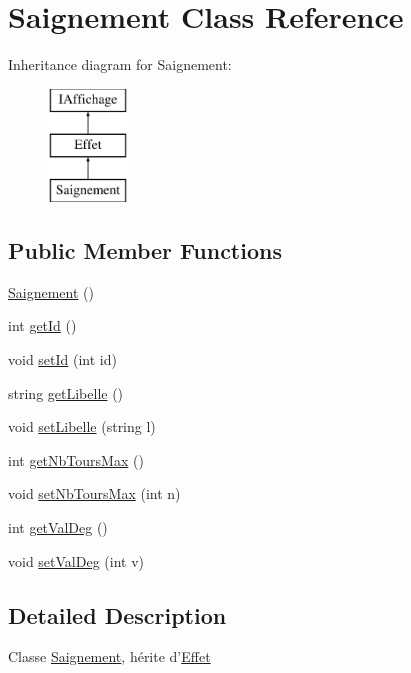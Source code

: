\hypertarget{class_saignement}{\section{\-Saignement \-Class \-Reference}
\label{class_saignement}
}
\-Inheritance diagram for \-Saignement\-:\begin{figure}[H]
\begin{center}
\leavevmode
\includegraphics[height=3.000000cm]{class_saignement}
\end{center}
\end{figure}
\subsection*{\-Public \-Member \-Functions}
\begin{DoxyCompactItemize}
\item 
\hyperlink{class_saignement_a83d7b835d237439cf350507765dbf8cf}{\-Saignement} ()
\item 
int \hyperlink{class_saignement_a57ccf17cade8c253a7ee99e7f816eb10}{get\-Id} ()
\item 
void \hyperlink{class_saignement_af9d66877c7e2aff769b4bc48f4bb82e4}{set\-Id} (int id)
\item 
string \hyperlink{class_saignement_aca2c045c2faa9384b6cf25ec3c11af28}{get\-Libelle} ()
\item 
void \hyperlink{class_saignement_a2c9f7ffb81aa8848564389580c4f7112}{set\-Libelle} (string l)
\item 
int \hyperlink{class_saignement_a498bf00562314e4094be4004e5bc653a}{get\-Nb\-Tours\-Max} ()
\item 
void \hyperlink{class_saignement_ae31708c65c109f4169d1e79fca31eade}{set\-Nb\-Tours\-Max} (int n)
\item 
int \hyperlink{class_saignement_a16b32f7a90575e7d80695bcc8a5a03c8}{get\-Val\-Deg} ()
\item 
void \hyperlink{class_saignement_a5b3fcda8a30588355f7cb5699131c8a0}{set\-Val\-Deg} (int v)
\end{DoxyCompactItemize}


\subsection{\-Detailed \-Description}
\-Classe \hyperlink{class_saignement}{\-Saignement}, hérite d'\hyperlink{class_effet}{\-Effet} 

